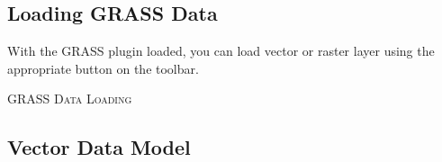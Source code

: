 % 
% 
% 
% 
% 
%  
% 
%  
% 

\subsection{Loading GRASS Data}\label{sec:load_grassdata}

With the GRASS plugin loaded, you can load vector or raster layer using the
appropriate button on the toolbar. 

\begin{Tip}\caption{\textsc{GRASS Data Loading}}
\end{Tip} 

\subsection{Vector Data Model}\label{label_vectmodel}

